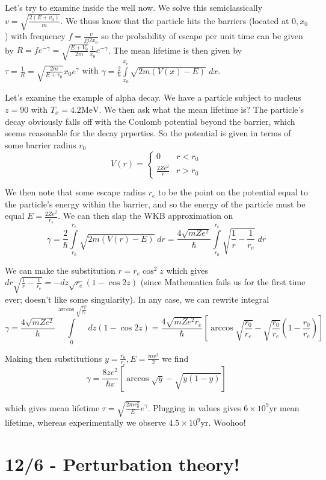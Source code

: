 \documentclass[10pt]{report}
\newcommand{\scinot}[2]{#1\times 10^{#2}}
\begin{document}
Let's try to examine inside the well now. We solve this semiclassically $v = \sqrt{\frac{2(E + v_0)}{m}}$. We thuss know that the particle hits the barriers (located at $0,x_0$) with frequency $f = \frac{v}{jj2x_0}$ so the probability of escape per unit time can be given by $R = fe^{-\gamma} = \sqrt{\frac{E+V_0}{2m}}\frac{1}{x_0}e^{-\gamma}$. The mean lifetime is then given by $\tau = \frac{1}{R} = \sqrt{\frac{2m}{E+v_0}}x_0 e^{\gamma}$ with $\gamma = \frac{2}{\hbar} \displaystyle\int\limits_{x_0}^{x_e}\sqrt{2m(V(x) - E)}\;dx$.

Let's examine the example of alpha decay. We have a particle subject to nucleus $z = 90$ with $T_x = 4.2\mathrm{MeV}$. We then ask what the mean lifetime is? The particle's decay obviously falls off with the Coulomb potential beyond the barrier, which seems reasonable for the decay prperties. So the potential is given in terms of some barrier radius $r_0$ 
$$V(r) = \begin{cases}0&r < r_0\\ \frac{2Ze^2}{r} & r > r_0\end{cases}$$

We then note that some escape radius $r_e$ to be the point on the potential equal to the particle's energy within the barrier, and so the energy of the particle must be equal $E = \frac{2Ze^2}{r_e}$. We can then slap the WKB approximation on
$$\gamma = \frac{2}{\hbar}\displaystyle\int\limits_{r_0}^{r_e}\sqrt{2m(V(r) - E)}\;dr = \frac{4\sqrt{mZe^2}}{\hbar}\displaystyle\int\limits_{r_0}^{r_e}\sqrt{\frac{1}{r} - \frac{1}{r_e}}\;dr$$

We can make the substitution $r = r_e\cos^2 z$ which gives $dr \sqrt{\frac{1}{r} - \frac{1}{r_e}} = -dz\sqrt{r_e}(1-\cos 2z)$ (since Mathematica fails us for the first time ever; doesn't like some singularity). In any case, we can rewrite integral
$$\gamma = \frac{4\sqrt{mZe^2}}{\hbar}\displaystyle\int\limits_{0}^{\arccos \sqrt{\frac{r_0}{r_e}}} dz(1-\cos 2z) = \frac{4\sqrt{mZe^2r_e}}{\hbar}\left[ \arccos\sqrt{\frac{r_0}{r_e}} - \sqrt{\frac{r_0}{r_e}}\left( 1-\frac{r_0}{r_e} \right) \right]$$

Making then substitutions $y = \frac{r_0}{r_e}, E = \frac{mv^2}{2}$ we find
$$\gamma = \frac{8ze^2}{\hbar v}\left[ \arccos\sqrt{y} - \sqrt{y(1-y)} \right]$$

which gives mean lifetime $\tau = \sqrt{\frac{2mr_0^2}{E}}e^\gamma$. Plugging in values gives $\scinot{6}{9}\mathrm{yr}$ mean lifetime, whereas experimentally we observe $\scinot{4.5}{9}\mathrm{yr}$. Woohoo!
\chapter{12/6 - Perturbation theory!}
\end{document}
